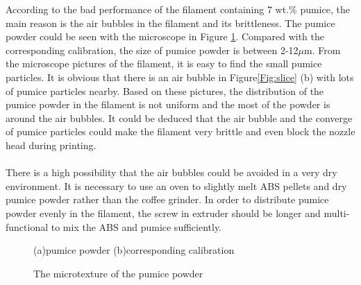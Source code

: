 According to the bad performance of the filament containing 7 wt.\% pumice, the main reason is the air bubbles in the filament and its brittleness. The pumice powder could be seen with the microscope in Figure \ref{Fig:pumice}. Compared with the corresponding calibration, the size of pumice powder is between 2-12$\mu$m. From the microscope pictures of the filament, it is easy to find the small pumice particles. It is obvious that there is an air bubble in Figure\ref{Fig:slice} (b) with lots of pumice particles nearby. Based on these pictures, the distribution of the pumice powder in the filament is not uniform and the most of the powder is around the air bubbles. It could be deduced that the air bubble and the converge of pumice particles could make the filament very brittle and even block the nozzle head during printing.\\
\\
There is a high possibility that the air bubbles could be avoided in a very dry environment. It is necessary to use an oven to slightly melt ABS pellets and dry pumice powder rather than the coffee grinder. In order to distribute pumice powder evenly in the filament, the screw in extruder should be longer and multi-functional to mix the ABS and pumice sufficiently.
\begin{figure}[htbp] %
	\centering
  \caption{The microtexture of the pumice powder}{\footnotesize (a)pumice powder (b)corresponding calibration }
    \label{Fig:pumice}
\end{figure}

